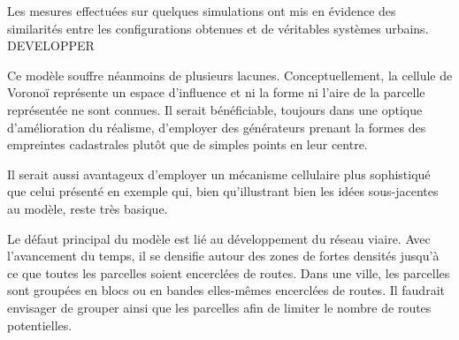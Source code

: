\documentclass[10pt]{article}
\begin{document}
Les mesures effectuées sur quelques simulations ont mis en évidence
des similarités entre les configurations obtenues et de véritables
systèmes urbains. DEVELOPPER

Ce modèle souffre néanmoins de plusieurs lacunes. Conceptuellement, la
cellule de Voronoï représente un espace d'influence et ni la forme ni
l'aire de la parcelle représentée ne sont connues. Il serait
bénéficiable, toujours dans une optique d'amélioration du réalisme,
d'employer des générateurs prenant la formes des empreintes
cadastrales plutôt que de simples points en leur centre.

Il serait aussi avantageux d'employer un mécanisme cellulaire plus
sophistiqué que celui présenté en exemple qui, bien qu'illustrant bien
les idées sous-jacentes au modèle, reste très basique.

Le défaut principal du modèle est lié au développement du réseau
viaire. Avec l'avancement du temps, il se densifie autour des zones de
fortes densités jusqu'à ce que toutes les parcelles soient encerclées
de routes. Dans une ville, les parcelles sont groupées en blocs ou en
bandes elles-mêmes encerclées de routes. Il faudrait envisager de
grouper ainsi que les parcelles afin de limiter le nombre de routes
potentielles.

\printbibliography
\end{document}
